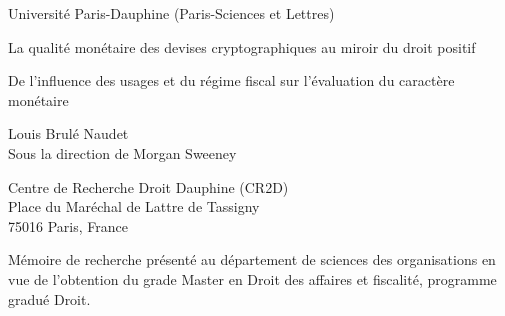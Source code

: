 \begin{titlepage}
\begin{center}
{Université Paris-Dauphine (Paris-Sciences et Lettres)} \vspace{1.5 cm}\\
\end{center}
\begin{center}
\Huge{La qualité monétaire des devises cryptographiques au miroir du droit positif}
\end{center}
\vspace{0cm}
\begin{center}
\Large{De l'influence des usages et du régime fiscal sur l'évaluation du caractère monétaire}
\end{center}
\vspace{1.5 cm}
\begin{center}
\normalsize{Louis Brulé Naudet \\ Sous la direction de Morgan Sweeney}
\vspace{1.5 cm}
\end{center}
\begin{center}
Centre de Recherche Droit Dauphine (CR2D)\\
Place du Maréchal de Lattre de Tassigny\\
75016 Paris, France
\end{center}
\vspace{1.5 cm}
\begin{center}
Mémoire de recherche présenté au département de sciences des organisations en vue de l'obtention du grade Master en Droit des affaires et fiscalité, programme gradué Droit.
\end{center}
\vspace{1.5 cm}
\end{titlepage}
